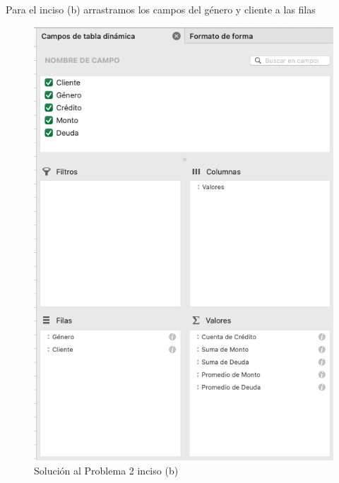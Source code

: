 \documentclass{article}
\begin{document}
\noindent
Para el inciso (b) arrastramos los campos del género y cliente a las filas
\begin{figure}[!h]
    \centering
    \begin{minipage}{\textwidth}
        \centering
        \includegraphics[width=\textwidth]{figures/s102-2.png}
    \end{minipage}
    \captionsetup{width=0.9\textwidth}
    \caption{Solución al Problema 2 inciso (b)}
    \label{fig:s102-2}
\end{figure}
\end{document}
